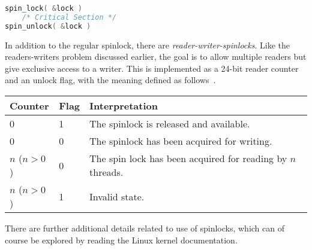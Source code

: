 \begin{lstlisting}[language=C]
spin_lock( &lock )
    /* Critical Section */
spin_unlock( &lock )
\end{lstlisting}

In addition to the regular spinlock, there are \textit{reader-writer-spinlocks}. Like the readers-writers problem discussed earlier, the goal is to allow multiple readers but give exclusive access to a writer. This is implemented as a 24-bit reader counter and an unlock flag, with the meaning defined as follows~\cite{osi}.

\begin{center}
	\begin{tabular}{l|l|l}
		\textbf{Counter} & \textbf{Flag} & \textbf{Interpretation}                                     \\\hline
		0                & 1             & The spinlock is released and available.                     \\
		0                & 0             & The spinlock has been acquired for writing.                 \\
		$n$ ($n > 0$)    & 0             & The spin lock has been acquired for reading by $n$ threads. \\
		$n$ ($n > 0$)    & 1             & Invalid state.                                              \\
	\end{tabular}
\end{center}

There are further additional details related to use of spinlocks, which can of course be explored by reading the Linux kernel documentation.




